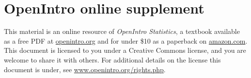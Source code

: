 \documentclass[10pt,openany,oneside]{book}
\date{}
\begin{document}
\section*{OpenIntro online supplement}

This material is an online resource of \emph{OpenIntro Statistics}, a textbook available as a free PDF at \href{http://www.openintro.org}{openintro.org} and for under \$10 as a paperback on \href{http://www.amazon.com/dp/1478217200}{amazon.com}. This document is licensed to you under a Creative Commons license, and you are welcome to share it with others. For additional details on the license this document is under, see \href{http://www.openintro.org/rights.php}{www.openintro.org/rights.php}.


\end{document}
